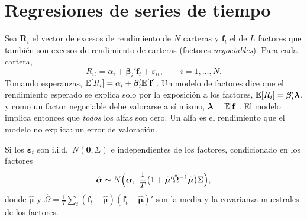 \section{Regresiones de series de tiempo}

Sea $\mathbf R_t$ el vector de excesos de rendimiento de $N$ carteras y $\mathbf f_t$ el de $L$ factores que también
son excesos de rendimiento de carteras (factores \emph{negociables}). Para cada cartera,
\[
  R_{it}=\alpha_i+\boldsymbol\beta_i'\mathbf f_t+\varepsilon_{it},\qquad i=1,\dots,N .
\]
Tomando esperanzas, $\mathbb{E}[R_i]=\alpha_i+\boldsymbol\beta_i'\mathbb{E}[\mathbf f]$. Un modelo de factores dice que el rendimiento
esperado se explica solo por la exposición a los factores, $\mathbb{E}[R_i]=\boldsymbol\beta_i'\boldsymbol\lambda$, y como un
factor negociable debe valorarse a sí mismo, $\boldsymbol\lambda=\mathbb{E}[\mathbf f]$. El modelo implica entonces que
\emph{todos} los alfas son cero. Un alfa es el rendimiento que el modelo no explica: un error de valoración.

\begin{proposicion}\label{prop:alfas}
Si los $\boldsymbol\varepsilon_t$ son i.i.d.\ $N(\mathbf 0,\Sigma)$ e independientes de los factores, condicionado en los
factores
\[
  \hat{\boldsymbol\alpha}\sim N\Bigl(\boldsymbol\alpha,\ \frac{1}{T}\bigl(1+\hat{\boldsymbol\mu}'\hat\Omega^{-1}\hat{\boldsymbol\mu}\bigr)\Sigma\Bigr),
\]
donde $\hat{\boldsymbol\mu}$ y $\hat\Omega=\frac1T\sum_t(\mathbf f_t-\hat{\boldsymbol\mu})(\mathbf f_t-\hat{\boldsymbol\mu})'$ son la media y la
covarianza muestrales de los factores.
\end{proposicion}

